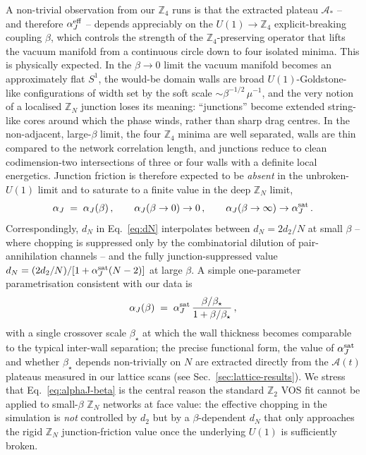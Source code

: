 A non-trivial observation from our $\mathbb{Z}_4$ runs is that the
extracted plateau $\mathcal{A}_{*}$ -- and therefore $\alpha_J^{\rm
eff}$ -- depends appreciably on the $U(1)\to\mathbb{Z}_4$
explicit-breaking coupling $\beta$, which controls the strength of the
$\mathbb{Z}_4$-preserving operator that lifts the vacuum manifold from
a continuous circle down to four isolated minima. This is physically
expected. In the $\beta\to 0$ limit the vacuum manifold becomes an
approximately flat $S^{1}$, the would-be domain walls are broad
$U(1)$-Goldstone-like configurations of width set by the soft scale
$\sim\beta^{-1/2}\,\mu^{-1}$, and the very notion of a localised
$\mathbb{Z}_N$ junction loses its meaning: ``junctions'' become
extended string-like cores around which the phase winds, rather than
sharp drag centres. In the non-adjacent, large-$\beta$ limit, the four
$\mathbb{Z}_4$ minima are well separated, walls are thin compared to
the network correlation length, and junctions reduce to clean
codimension-two intersections of three or four walls with a definite
local energetics. Junction friction is therefore expected to be
\emph{absent} in the unbroken-$U(1)$ limit and to saturate to a finite
value in the deep $\mathbb{Z}_N$ limit,
\begin{equation}
\label{eq:alphaJ-beta}
\alpha_J \;=\; \alpha_J(\beta)\,, \qquad
\alpha_J(\beta\to 0)\to 0\,,\qquad
\alpha_J(\beta\to\infty) \to \alpha_J^{\rm sat}\,.
\end{equation}
Correspondingly, $d_N$ in Eq.~\eqref{eq:dN} interpolates between
$d_N=2d_2/N$ at small $\beta$ -- where chopping is suppressed only by
the combinatorial dilution of pair-annihilation channels -- and the
fully junction-suppressed value
$d_N = (2 d_2/N)/[1+\alpha_J^{\rm sat}(N-2)]$ at large $\beta$. A
simple one-parameter parametrisation consistent with our data is
\begin{equation}
\label{eq:alphaJ-form}
\alpha_J(\beta) \;=\; \alpha_J^{\rm sat}\,\frac{\beta/\beta_{\star}}{1+\beta/\beta_{\star}}\,,
\end{equation}
with a single crossover scale $\beta_{\star}$ at which the wall
thickness becomes comparable to the typical inter-wall separation;
the precise functional form, the value of $\alpha_J^{\rm sat}$ and
whether $\beta_{\star}$ depends non-trivially on $N$ are extracted
directly from the $\mathcal{A}(t)$ plateaus measured in our lattice
scans (see Sec.~\ref{sec:lattice-results}). We stress that
Eq.~\eqref{eq:alphaJ-beta} is the central reason the standard
$\mathbb{Z}_2$ VOS fit cannot be applied to small-$\beta$ $\mathbb{Z}_N$
networks at face value: the effective chopping in the simulation is
\emph{not} controlled by $d_2$ but by a $\beta$-dependent $d_N$ that
only approaches the rigid $\mathbb{Z}_N$ junction-friction value once
the underlying $U(1)$ is sufficiently broken.

